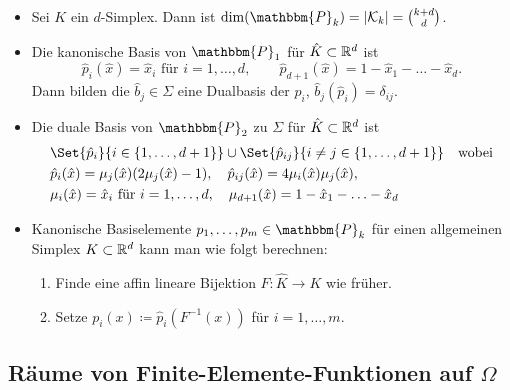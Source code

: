 \documentclass{cheat-sheet}
\newcommand{\Poly}{\mathbbm{P}} %
\begin{document}
\begin{bemn}
  \begin{itemize}
    \item Sei $K$ ein $d$-Simplex. Dann ist $\dim(\Poly_k) = \abs{\mathcal{K}_k} = \binom{k+d}{d}$.
    \item Die kanonische Basis von $\Poly_1$ für $\hat{K} \subset \mathbb{R}^d$ ist
    \[
      \hat{p}_i(\hat{x}) = \hat{x}_i \text{ für } i = 1, \ldots, d, \qquad
      \hat{p}_{d+1}(\hat{x}) = 1 - \hat{x}_1 - \ldots - \hat{x}_d.
    \]
    Dann bilden die $\hat{b}_j \in \Sigma$ eine Dualbasis der $\hat{p}_i$, \dh{} $\hat{b}_j(\hat{p}_i) = \delta_{ij}$.
    \item Die duale Basis von $\Poly_2$ zu $\Sigma$ für $\hat{K} \subset \mathbb{R}^d$ ist
    \begin{align*}
      & \Set{\hat{p}_i}{i \in \{ 1, \ldots, d+1 \} } \cup \Set{\hat{p}_{ij}}{i \neq j \in \{ 1, \ldots, d+1 \}} \quad \text{wobei} \\
      & \hat{p}_i(\hat{x}) = \mu_j(\hat{x}) (2 \mu_j(\hat{x}) - 1), \quad
      \hat{p}_{ij}(\hat{x}) = 4 \mu_i(\hat{x}) \mu_j(\hat{x}), \\
      & \mu_i(\hat{x}) = \hat{x}_i \text{ für } i = 1, \ldots, d, \quad
      \mu_{d+1}(\hat{x}) = 1 - \hat{x}_1 - \ldots - \hat{x}_d
    \end{align*}
    \item Kanonische Basiselemente $p_1, \ldots, p_m \in \Poly_k$ für einen allgemeinen Simplex $K \subset \mathbb{R}^d$ kann man wie folgt berechnen:
    \begin{enumerate}
      \item Finde eine affin lineare Bijektion $F : \hat{K} \to K$ wie früher.
      \item Setze $p_i(x) \coloneqq \hat{p}_i(F^{-1}(x))$ für $i = 1, \ldots, m$.
    \end{enumerate}
  \end{itemize}
\end{bemn}


\subsection{Räume von Finite-Elemente-Funktionen auf $\Omega$}

\end{document}
